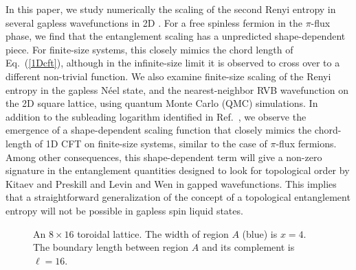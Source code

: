 \documentclass[prl,aps,twocolumn,floatfix,amsmath,amssymb,superscriptaddress,tightenlines]{revtex4}
\begin{document}
In this paper, we study numerically the scaling of the second Renyi entropy in several gapless wavefunctions in 2D \cite{Misguich}.
For a free spinless fermion in the $\pi$-flux phase, we find that the entanglement scaling has a unpredicted shape-dependent piece.
For finite-size systems, this closely mimics the chord length of Eq.~(\ref{1Dcft}), although in the infinite-size limit 
it is observed to cross over to a different non-trivial function.
We also examine finite-size scaling of the Renyi entropy in the gapless N\'eel state, and the nearest-neighbor RVB wavefunction
on the 2D square lattice, using quantum Monte Carlo (QMC) simulations.
In addition to the subleading logarithm identified in Ref.~\cite{HeisLog},
we observe the emergence of a shape-dependent scaling function that closely mimics the chord-length of 1D CFT on finite-size systems, similar to the case of $\pi$-flux fermions.
Among other consequences, this shape-dependent term will give a non-zero signature in the entanglement quantities designed to look for topological order by Kitaev and Preskill \cite{KP} and Levin and Wen \cite{LW} in gapped wavefunctions.  This implies that a straightforward generalization of the concept of a topological entanglement entropy will not be possible in gapless spin liquid states.



 \begin{figure}
   \begin{center}
   \end{center}
   \caption{An $8 \times 16$ toroidal lattice.  The width of region $A$ (blue) is $x=4$.  The boundary length between region $A$ and its complement is $\ell = 16$. }
   \label{fig:torus}
 \end{figure}
 
\end{document}

